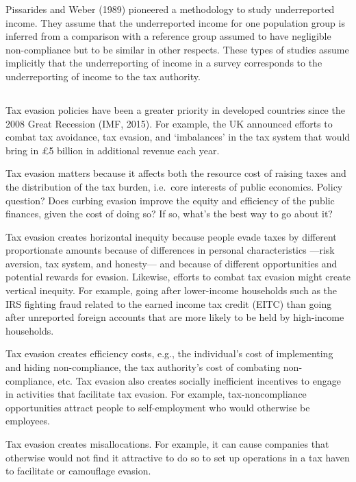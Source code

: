 \documentclass[
  12pt]{article}
\theoremstyle{definition}
\theoremstyle{remark}
\begin{document}
Pissarides and Weber (1989) pioneered a methodology to study
underreported income. They assume that the underreported income for one
population group is inferred from a comparison with a reference group
assumed to have negligible non-compliance but to be similar in other
respects. These types of studies assume implicitly that the
underreporting of income in a survey corresponds to the underreporting
of income to the tax authority.

\subsection{\texorpdfstring{\citet{Slemrod2019}}{@Slemrod2019}}\label{slemrod2019}

Tax evasion policies have been a greater priority in developed countries
since the 2008 Great Recession (IMF, 2015). For example, the UK
announced efforts to combat tax avoidance, tax evasion, and `imbalances'
in the tax system that would bring in \pounds 5 billion in additional
revenue each year.

Tax evasion matters because it affects both the resource cost of raising
taxes and the distribution of the tax burden, i.e.~core interests of
public economics. Policy question? Does curbing evasion improve the
equity and efficiency of the public finances, given the cost of doing
so? If so, what's the best way to go about it?

Tax evasion creates horizontal inequity because people evade taxes by
different proportionate amounts because of differences in personal
characteristics ---risk aversion, tax system, and honesty--- and because
of different opportunities and potential rewards for evasion. Likewise,
efforts to combat tax evasion might create vertical inequity. For
example, going after lower-income households such as the IRS fighting
fraud related to the earned income tax credit (EITC) than going after
unreported foreign accounts that are more likely to be held by
high-income households.

Tax evasion creates efficiency costs, e.g., the individual's cost of
implementing and hiding non-compliance, the tax authority's cost of
combating non-compliance, etc. Tax evasion also creates socially
inefficient incentives to engage in activities that facilitate tax
evasion. For example, tax-noncompliance opportunities attract people to
self-employment who would otherwise be employees.

Tax evasion creates misallocations. For example, it can cause companies
that otherwise would not find it attractive to do so to set up
operations in a tax haven to facilitate or camouflage evasion.
\end{document}
